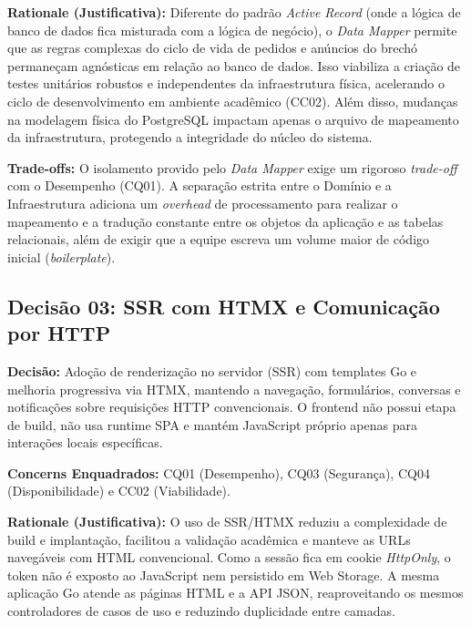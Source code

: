 ﻿\documentclass[12pt,a4paper]{article}
\begin{document}
\vspace{0.3cm}
\noindent\textbf{Rationale (Justificativa):} 
Diferente do padrão \textit{Active Record} (onde a lógica de banco de dados fica misturada com a lógica de negócio), o \textit{Data Mapper} permite que as regras complexas do ciclo de vida de pedidos e anúncios do brechó permaneçam agnósticas em relação ao banco de dados. Isso viabiliza a criação de testes unitários robustos e independentes da infraestrutura física, acelerando o ciclo de desenvolvimento em ambiente acadêmico (CC02). Além disso, mudanças na modelagem física do PostgreSQL impactam apenas o arquivo de mapeamento da infraestrutura, protegendo a integridade do núcleo do sistema.

\vspace{0.3cm}
\noindent\textbf{Trade-offs:} O isolamento provido pelo \textit{Data Mapper} exige um rigoroso \textit{trade-off} com o Desempenho (CQ01). A separação estrita entre o Domínio e a Infraestrutura adiciona um \textit{overhead} de processamento para realizar o mapeamento e a tradução constante entre os objetos da aplicação e as tabelas relacionais, além de exigir que a equipe escreva um volume maior de código inicial (\textit{boilerplate}).

\subsection{Decisão 03: SSR com HTMX e Comunicação por HTTP}

\noindent\textbf{Decisão:} Adoção de renderização no servidor (SSR) com templates Go e melhoria progressiva via HTMX, mantendo a navegação, formulários, conversas e notificações sobre requisições HTTP convencionais. O frontend não possui etapa de build, não usa runtime SPA e mantém JavaScript próprio apenas para interações locais específicas.

\vspace{0.3cm}
\noindent\textbf{Concerns Enquadrados:} CQ01 (Desempenho), CQ03 (Segurança), CQ04 (Disponibilidade) e CC02 (Viabilidade).

\vspace{0.3cm}
\noindent\textbf{Rationale (Justificativa):} 
O uso de SSR/HTMX reduziu a complexidade de build e implantação, facilitou a validação acadêmica e manteve as URLs navegáveis com HTML convencional. Como a sessão fica em cookie \textit{HttpOnly}, o token não é exposto ao JavaScript nem persistido em Web Storage. A mesma aplicação Go atende as páginas HTML e a API JSON, reaproveitando os mesmos controladores de casos de uso e reduzindo duplicidade entre camadas.
\end{document}
